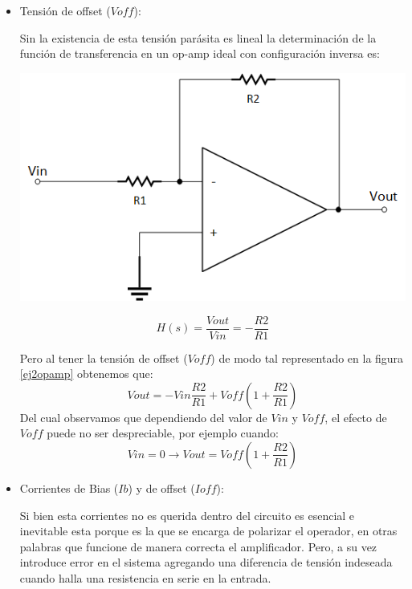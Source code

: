 \begin{itemize}
    \item Tensión de offset ($Voff$): 
    
    Sin la existencia de esta tensión parásita es lineal la determinación de la función de transferencia en un op-amp ideal con configuración inversa es:
    
    \begin{minipage}{.45\textwidth}
        \centering
        \includegraphics[scale = 0.5]{../Ejercicio2-MediciondeBias/Informe/inversopamp.png}
    \end{minipage}
    \begin{minipage}{.45\textwidth}
        $$H(s) = \frac{Vout}{Vin} = -\frac{R2}{R1}$$
    \end{minipage}

    Pero al tener la tensión de offset ($Voff$) de modo tal representado en la figura \ref{ej2opamp} obtenemos que:
    $$Vout = -Vin\frac{R2}{R1} + Voff\left(1 + \frac{R2}{R1}\right)$$
    Del cual observamos que dependiendo del valor de $Vin$ y $Voff$, el efecto de $Voff$ puede no ser despreciable, por ejemplo cuando:
    $$Vin = 0 \longrightarrow Vout = Voff \left(1 + \frac{R2}{R1}\right)$$
    
    \item Corrientes de Bias ($Ib$) y de offset ($Ioff$):
    
    Si bien esta corrientes no es querida dentro del circuito es esencial e inevitable esta porque es la que se encarga de polarizar el operador, en otras palabras que funcione de manera correcta el amplificador. Pero, a su vez introduce error en el sistema agregando una diferencia de tensión indeseada cuando halla una resistencia en serie en la entrada.
    
\end{itemize}

